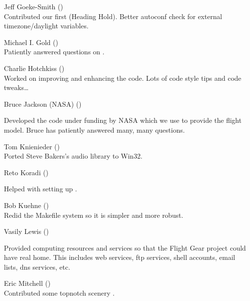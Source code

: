 \noindent Jeff Goeke-Smith ()\\
  Contributed our first  (Heading Hold).
  Better autoconf check for external timezone/daylight variables.
 \medskip

\noindent Michael I. Gold ()\\
 Patiently answered questions on .
 \medskip

\noindent Charlie Hotchkiss
()\\ Worked on improving and enhancing the
 code.  Lots of code style tips and code tweaks\ldots
 \medskip

\noindent Bruce Jackson (NASA) ()


 \noindent
   Developed the  code under funding by NASA which we use to provide the
   flight model. Bruce has patiently answered many, many questions.
 \medskip

\noindent Tom Knienieder ()\\
  Ported Steve Bakers's audio library to Win32.
 \medskip

\noindent Reto Koradi ()

\href{\web{http://www.mol.biol.ethz.ch/~kor}}{}

\noindent
  Helped with setting up .
 \medskip

\noindent Bob Kuehne ()\\
  Redid the Makefile system so it is simpler and more robust.
 \medskip

\noindent Vasily Lewis ()


 \noindent
  Provided computing resources and services so that the Flight Gear
  project could have real home.  This includes web services, ftp
  services, shell accounts, email lists, dns services, etc.
 \medskip

\noindent Eric Mitchell ()\\
  Contributed some topnotch scenery .
 \medskip

